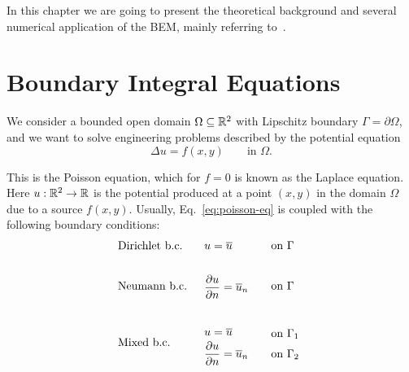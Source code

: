 In this chapter we are going to present the theoretical background and several numerical application of the BEM, mainly referring to~\cite{sbemKatsi}.

\newpage

\section{Boundary Integral Equations}
\label{sec:boundary_integral_equations}%

We consider a bounded open domain $\Omega\subseteq\mathbb{R}^2$ with Lipschitz boundary $\Gamma=\partial\Omega$, and we want to solve engineering problems described by the potential equation
\begin{equation}
\label{eq:poisson-eq}
\Delta u=f(x,y)\qquad \text{in }\Omega.
\end{equation}

This is the Poisson equation, which for $f=0$ is known as the Laplace equation. Here $u:\mathbb{R}^2\to\mathbb{R}$ is the potential produced at a point $(x,y)$ in the domain $\Omega$ due to a source $f(x,y)$. Usually, Eq.~\eqref{eq:poisson-eq} is coupled with the following boundary conditions:
\begin{align}
&
\text{Dirichlet b.c.} 
&& 
{\renewcommand*{\arraystretch}{1}
\begin{array}{l}
u=\overline{u}
\end{array}} 
&&
{\renewcommand*{\arraystretch}{1}
\begin{array}{l}
\text{on }\Gamma
\end{array}} 
\label{eq:Dbc} 
\\
& && && \nonumber\\
&
\text{Neumann b.c.} 
&& 
{\renewcommand*{\arraystretch}{1}
\begin{array}{l}
\displaystyle\frac{\partial u}{\partial n}=\overline{u}_n
\end{array}}
&&
{\renewcommand*{\arraystretch}{1}
\begin{array}{l}
\text{on }\Gamma
\end{array}} 
\label{eq:Nbc} 
\\
& && && \nonumber\\
&
\text{Mixed b.c.} 
&&
{\renewcommand*{\arraystretch}{1.5}
\begin{array}{l}
u=\overline{u} \\
\displaystyle\frac{\partial u}{\partial n}=\overline{u}_n
\end{array}}
&&
{\renewcommand*{\arraystretch}{1.5}
\begin{array}{l}
\text{on }\Gamma_1 \\
\text{on }\Gamma_2
\end{array}}
\label{eq:Mbc}
\end{align}

